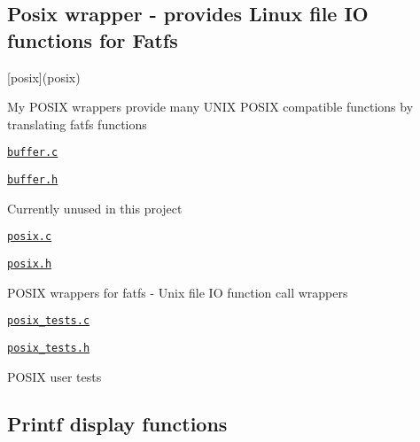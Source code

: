 \subsection*{Posix wrapper -\/ provides Linux file IO functions for Fatfs}


\begin{DoxyItemize}
\item \mbox{[}posix\mbox{]}(posix)
\begin{DoxyItemize}
\item My P\+O\+S\+IX wrappers provide many U\+N\+IX P\+O\+S\+IX compatible functions by translating fatfs functions
\item \href{buffer.c}{\tt buffer.\+c}
\item \href{buffer.h}{\tt buffer.\+h}
\begin{DoxyItemize}
\item Currently unused in this project
\end{DoxyItemize}
\item \href{posix/posix.c}{\tt posix.\+c}
\item \href{posix/posix.h}{\tt posix.\+h}
\begin{DoxyItemize}
\item P\+O\+S\+IX wrappers for fatfs -\/ Unix file IO function call wrappers
\end{DoxyItemize}
\item \href{posix/posix_tests.c}{\tt posix\+\_\+tests.\+c}
\item \href{posix/posix_tests.h}{\tt posix\+\_\+tests.\+h}
\begin{DoxyItemize}
\item P\+O\+S\+IX user tests
\end{DoxyItemize}
\end{DoxyItemize}
\end{DoxyItemize}

\subsection*{Printf display functions}


